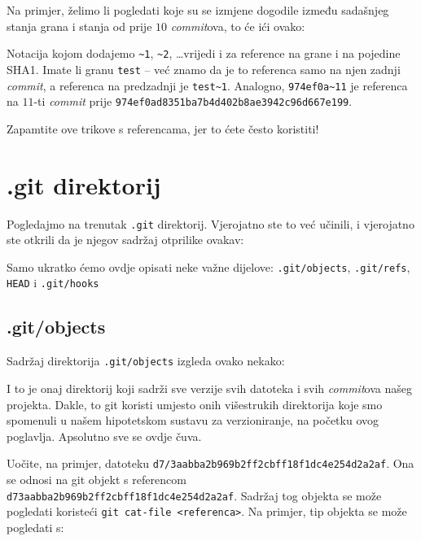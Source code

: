 Na primjer, želimo li pogledati koje su se izmjene dogodile između sadašnjeg stanja grana i stanja od prije $10$ \emph{commit}ova, to će ići ovako:


Notacija kojom dodajemo \verb+~1+, \verb+~2+, \dots vrijedi i za reference na grane i na pojedine SHA1.
Imate li granu \verb+test+ -- već znamo da je to referenca samo na njen zadnji \emph{commit}, a referenca na predzadnji je \verb+test~1+.
Analogno, \verb+974ef0a~11+ je referenca na $11$-ti \emph{commit} prije \verb+974ef0ad8351ba7b4d402b8ae3942c96d667e199+.

Zapamtite ove trikove s referencama, jer to ćete često koristiti!

\section*{.git direktorij}

Pogledajmo na trenutak \verb+.git+ direktorij. 
Vjerojatno ste to već učinili, i vjerojatno ste otkrili da je njegov sadržaj otprilike ovakav:



Samo ukratko ćemo ovdje opisati neke važne dijelove: \verb+.git/objects+, \verb+.git/refs+, \verb+HEAD+ i \verb+.git/hooks+

\subsection*{.git/objects}

Sadržaj direktorija \verb+.git/objects+ izgleda ovako nekako:



I to je onaj direktorij koji sadrži sve verzije svih datoteka i svih \emph{commit}ova našeg projekta.
Dakle, to git koristi umjesto onih višestrukih direktorija koje smo spomenuli u našem hipotetskom sustavu za verzioniranje, na početku ovog poglavlja.
Apsolutno sve se ovdje čuva.

Uočite, na primjer, datoteku \verb+d7/3aabba2b969b2ff2cbff18f1dc4e254d2a2af+.
Ona se odnosi na git objekt s referencom \verb+d73aabba2b969b2ff2cbff18f1dc4e254d2a2af+.
Sadržaj tog objekta se može pogledati koristeći \verb+git cat-file <referenca>+.
Na primjer, tip objekta se može pogledati s:

